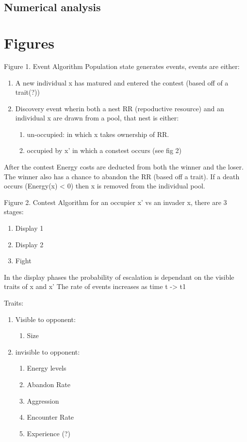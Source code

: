 \documentclass[a4paper,11pt]{article}
\begin{document}
\subsection{Numerical analysis}

\section{Figures}
Figure 1. Event Algorithm
Population state generates events, events are either:
\begin{enumerate}
    \item A new individual x has matured and entered the contest (based off of a trait(?))
    \item Discovery event wherin both a nest RR (repoductive resource) and an individual x are drawn from a pool, that nest is either:
\begin{enumerate}
    \item un-occupied: in which x takes ownership of RR.
    \item occupied by x' in which a constest occurs (see fig 2)
\end{enumerate}
\end{enumerate}
After the contest Energy costs are deducted from both the winner and the loser.
The winner also has a chance to abandon the RR (based off a trait).
If a death occurs (Energy(x) < 0) then x is removed from the individual pool.


Figure 2. Contest Algorithm
for an occupier x' vs an invader x, there are 3 stages:
\begin{enumerate}
    \item Display 1
    \item Display 2
    \item Fight
\end{enumerate}
In the display phases the probability of escalation is dependant on the visible traits of x and x'
The rate of events increases as time t -> t1

Traits:
\begin{enumerate}
    \item Visible to opponent:
\begin{enumerate}
    \item Size
\end{enumerate}
    \item invisible to opponent:
\begin{enumerate}
    \item Energy levels
    \item Abandon Rate
    \item Aggression
    \item Encounter Rate
    \item Experience (?)
\end{enumerate}
\end{enumerate}


\end{document}
